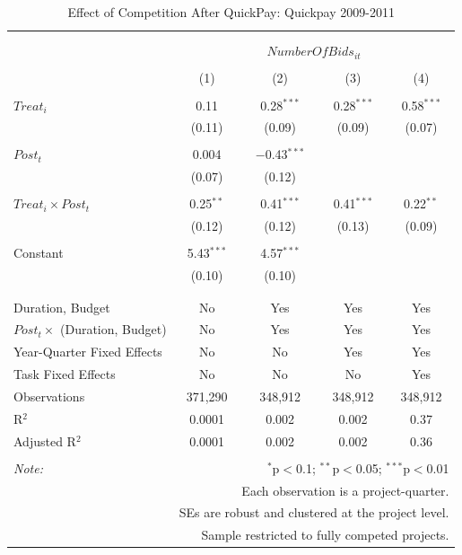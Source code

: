 \documentclass[
]{article}
\begin{document}
\begin{table}[H] \centering 
  \caption{Effect of Competition After QuickPay: Quickpay 2009-2011} 
  \label{} 
\small 
\begin{tabular}{@{\extracolsep{-2pt}}lcccc} 
\\[-1.8ex]\hline 
\hline \\[-1.8ex] 
\\[-1.8ex] & \multicolumn{4}{c}{$NumberOfBids_{it}$} \\ 
\\[-1.8ex] & (1) & (2) & (3) & (4)\\ 
\hline \\[-1.8ex] 
 $Treat_i$ & 0.11 & 0.28$^{***}$ & 0.28$^{***}$ & 0.58$^{***}$ \\ 
  & (0.11) & (0.09) & (0.09) & (0.07) \\ 
  & & & & \\ 
 $Post_t$ & 0.004 & $-$0.43$^{***}$ &  &  \\ 
  & (0.07) & (0.12) &  &  \\ 
  & & & & \\ 
 $Treat_i \times Post_t$ & 0.25$^{**}$ & 0.41$^{***}$ & 0.41$^{***}$ & 0.22$^{**}$ \\ 
  & (0.12) & (0.12) & (0.13) & (0.09) \\ 
  & & & & \\ 
 Constant & 5.43$^{***}$ & 4.57$^{***}$ &  &  \\ 
  & (0.10) & (0.10) &  &  \\ 
  & & & & \\ 
\hline \\[-1.8ex] 
Duration, Budget & No & Yes & Yes & Yes \\ 
$Post_t \times $  (Duration, Budget) & No & Yes & Yes & Yes \\ 
Year-Quarter Fixed Effects & No & No & Yes & Yes \\ 
Task Fixed Effects & No & No & No & Yes \\ 
Observations & 371,290 & 348,912 & 348,912 & 348,912 \\ 
R$^{2}$ & 0.0001 & 0.002 & 0.002 & 0.37 \\ 
Adjusted R$^{2}$ & 0.0001 & 0.002 & 0.002 & 0.36 \\ 
\hline 
\hline \\[-1.8ex] 
\textit{Note:}  & \multicolumn{4}{r}{$^{*}$p$<$0.1; $^{**}$p$<$0.05; $^{***}$p$<$0.01} \\ 
 & \multicolumn{4}{r}{Each observation is a project-quarter.} \\ 
 & \multicolumn{4}{r}{SEs are robust and clustered at the project level.} \\ 
 & \multicolumn{4}{r}{Sample restricted to fully competed projects.} \\ 
\end{tabular} 
\end{table}
\end{document}
